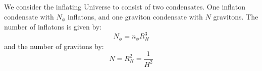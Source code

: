 We consider the inflating Universe to consist of two condensates. One inflaton condensate with $N_\phi$ inflatons, and one graviton condensate with $N$ gravitons. The number of inflatons is given by:
\begin{equation}
	N_\phi = n_\phi R_H^3
\end{equation}
and the number of gravitons by:
\begin{equation}
	N = R_H^2 = \frac{1}{H^2}
\end{equation}